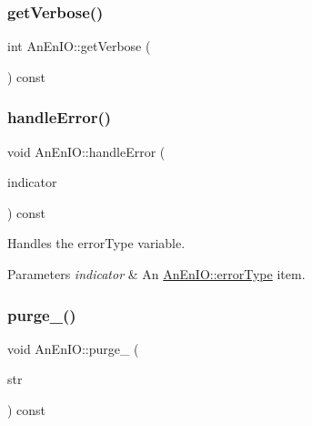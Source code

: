 \subsubsection{\texorpdfstring{get\+Verbose()}{getVerbose()}}
{\footnotesize\ttfamily int An\+En\+I\+O\+::get\+Verbose (\begin{DoxyParamCaption}{ }\end{DoxyParamCaption}) const}

\mbox{\label{class_an_en_i_o_a92276aeba9c0b5bd1cd3d285271d505f}} 
\subsubsection{\texorpdfstring{handle\+Error()}{handleError()}}
{\footnotesize\ttfamily void An\+En\+I\+O\+::handle\+Error (\begin{DoxyParamCaption}\item[{const \mbox{\hyperlink{class_an_en_i_o_aa56bc1ec6610b86db4349bce20f9ead0}{error\+Type}} \&}]{indicator }\end{DoxyParamCaption}) const}

Handles the error\+Type variable.


\begin{DoxyParams}{Parameters}
{\em indicator} & An \mbox{\hyperlink{class_an_en_i_o_aa56bc1ec6610b86db4349bce20f9ead0}{An\+En\+I\+O\+::error\+Type}} item. \\
\hline
\end{DoxyParams}
\mbox{\label{class_an_en_i_o_ae8ed483b1dcdbf2a15148d60f8067595}} 
\subsubsection{\texorpdfstring{purge\+\_\+()}{purge\_()}\hspace{0.1cm}{\footnotesize\ttfamily [1/2]}}
{\footnotesize\ttfamily void An\+En\+I\+O\+::purge\+\_\+ (\begin{DoxyParamCaption}\item[{std\+::string \&}]{str }\end{DoxyParamCaption}) const\hspace{0.3cm}{\ttfamily [protected]}}

